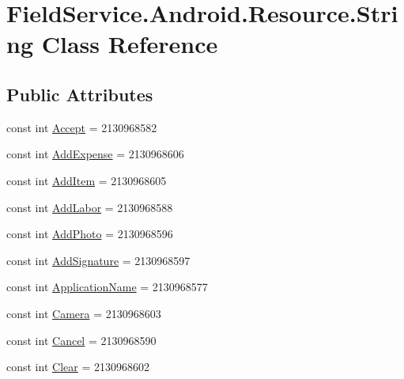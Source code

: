 \hypertarget{class_field_service_1_1_android_1_1_resource_1_1_string}{\section{Field\+Service.\+Android.\+Resource.\+String Class Reference}
\label{class_field_service_1_1_android_1_1_resource_1_1_string}
}
\subsection*{Public Attributes}
\begin{DoxyCompactItemize}
\item 
const int \hyperlink{class_field_service_1_1_android_1_1_resource_1_1_string_aebc9a538a9f823cecdf91809f2181b34}{Accept} = 2130968582
\item 
const int \hyperlink{class_field_service_1_1_android_1_1_resource_1_1_string_a7c8fae7622cc26d7b887c0a18dd8b0f9}{Add\+Expense} = 2130968606
\item 
const int \hyperlink{class_field_service_1_1_android_1_1_resource_1_1_string_a143eba02cb4ed18bb3982046c739c542}{Add\+Item} = 2130968605
\item 
const int \hyperlink{class_field_service_1_1_android_1_1_resource_1_1_string_ad1d40ff651112b2138af2eb40a3e938f}{Add\+Labor} = 2130968588
\item 
const int \hyperlink{class_field_service_1_1_android_1_1_resource_1_1_string_ab015a1b06f0fce1dd776acf31f69d6ca}{Add\+Photo} = 2130968596
\item 
const int \hyperlink{class_field_service_1_1_android_1_1_resource_1_1_string_afddf9f695ddc722479b4024d7f6a7479}{Add\+Signature} = 2130968597
\item 
const int \hyperlink{class_field_service_1_1_android_1_1_resource_1_1_string_af1edd3a493f7a57e40ac9c54554ab63c}{Application\+Name} = 2130968577
\item 
const int \hyperlink{class_field_service_1_1_android_1_1_resource_1_1_string_aafa859a6090e60fe995a57becb5984fe}{Camera} = 2130968603
\item 
const int \hyperlink{class_field_service_1_1_android_1_1_resource_1_1_string_a7953bc3a89e194eebb285aa0d58cd3ba}{Cancel} = 2130968590
\item 
const int \hyperlink{class_field_service_1_1_android_1_1_resource_1_1_string_a559c5b77e2e953b5867d9125db2f3403}{Clear} = 2130968602
\item 

\end{DoxyCompactItemize}
